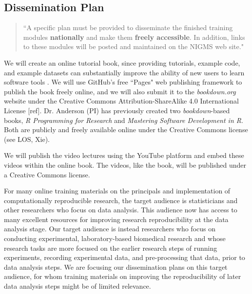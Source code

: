 \documentclass[pdftex,english,11pt,parskip=half]{scrartcl}
\begin{document}
\subsection{Dissemination Plan}

\begin{quotation}
``A specific plan must be provided to disseminate the finished training modules \textbf{nationally} and make them \textbf{freely accessible}. In addition, links to these modules will be posted and maintained on the NIGMS web site."
\end{quotation}

We will create an online tutorial book, since providing tutorials, example code, and example datasets can substantially improve the ability of new users to learn software tools \cite{list2017ten}. We will use GitHub's free ``Pages" web publishing framework to publish the book freely online, and we will also submit it to the \textit{bookdown.org} website under the Creative Commons Attribution-ShareAlike 4.0 International License [ref]. Dr. Anderson (PI) has previously created two \textit{bookdown}-based books, \textit{R Programming for Research} and \textit{Mastering Software Development in R}. Both are publicly and freely available online under the Creative Commons license (see LOS, Xie). 

We will publish the video lectures using the YouTube platform and embed these videos within the online book. The videos, like the book, will be published under a Creative Commons license.

For many online training materials on the principals and implementation of computationally reproducible research, the target audience is statisticians and other researchers who focus on data analysis. This audience now has access to many excellent resources for improving research reproducibility at the data analysis stage. Our target audience is instead researchers who focus on conducting experimental, laboratory-based biomedical research and whose research tasks are more focused on the earlier research steps of running experiments, recording experimental data, and pre-processing that data, prior to data analysis steps. We are focusing our dissemination plans on this target audience, for whom training materials on improving the reproducibility of later data analysis steps might be of limited relevance.
\end{document}
